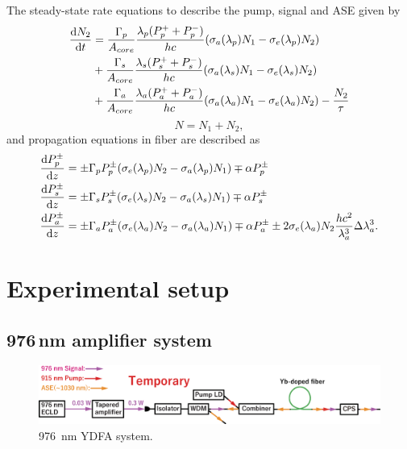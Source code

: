 \documentclass{osa-article}
\begin{document}
The steady-state rate equations to describe the pump, signal and ASE given by
\begin{equation}
  \begin{split}
    \dv{N_{2}}{t} &= \frac{\Gamma_{p}}{A_{core}} \frac{\lambda_{p}(P^{+}_{p} + P^{-}_{p})}{hc} (\sigma_{a}(\lambda_{p})N_{1} - \sigma_{e}(\lambda_{p})N_{2})\\
    &+ \frac{\Gamma_{s}}{A_{core}} \frac{\lambda_{s}(P^{+}_{s} + P^{-}_{s})}{hc} (\sigma_{a}(\lambda_{s})N_{1} - \sigma_{e}(\lambda_{s})N_{2})\\
    &+ \frac{\Gamma_{a}}{A_{core}} \frac{\lambda_{a}(P^{+}_{a} + P^{-}_{a})}{hc} (\sigma_{a}(\lambda_{a})N_{1} - \sigma_{e}(\lambda_{a})N_{2}) - \frac{N_{2}}{\tau}
  \end{split}
\end{equation}
\begin{equation*}
  N = N_{1} + N_{2},
\end{equation*}
and propagation equations in fiber are described as
\begin{align}
  \dv{P^{\pm}_{p}}{z} &= \pm\Gamma_{p}P^{\pm}_{p}(\sigma_{e}(\lambda_{p})N_{2} - \sigma_{a}(\lambda_{p})N_{1}) \mp \alpha P^{\pm}_{p}\\
  \dv{P^{\pm}_{s}}{z} &= \pm\Gamma_{s}P^{\pm}_{s}(\sigma_{e}(\lambda_{s})N_{2} - \sigma_{a}(\lambda_{s})N_{1}) \mp \alpha P^{\pm}_{s}\\
  \dv{P^{\pm}_{a}}{z} &= \pm\Gamma_{a}P^{\pm}_{a}(\sigma_{e}(\lambda_{a})N_{2} - \sigma_{a}(\lambda_{a})N_{1}) \mp \alpha P^{\pm}_{a} \pm 2\sigma_{e}(\lambda_{a})N_{2}\frac{hc^{2}}{\lambda_{a}^{3}}\Delta\lambda_{a}^{3}.
\end{align}

\section{Experimental setup}
\subsection{976\,nm amplifier system}

\begin{figure}[h!]
  \centering\includegraphics[width=\linewidth]{./Figure/976nmYDFASystem.eps}
  \caption{\SI{976}{\nm} YDFA system.}
  \label{fig:976YDFASystem}
\end{figure}
\end{document}
